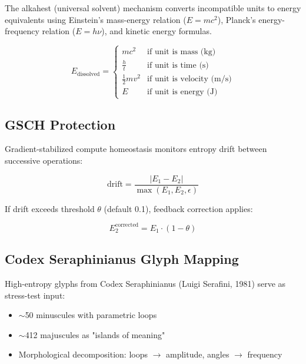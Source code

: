 \documentclass[11pt,a4paper]{article}
\begin{document}
The alkahest (universal solvent) mechanism converts incompatible units to energy equivalents using Einstein's mass-energy relation ($E = mc^2$), Planck's energy-frequency relation ($E = h\nu$), and kinetic energy formulas.

\begin{equation}
    E_{\text{dissolved}} = 
    \begin{cases}
        mc^2 & \text{if unit is mass (kg)} \\
        \frac{h}{t} & \text{if unit is time (s)} \\
        \frac{1}{2}mv^2 & \text{if unit is velocity (m/s)} \\
        E & \text{if unit is energy (J)}
    \end{cases}
\end{equation}

\subsection{GSCH Protection}

Gradient-stabilized compute homeostasis monitors entropy drift between successive operations:

\begin{equation}
    \text{drift} = \frac{|E_1 - E_2|}{\max(E_1, E_2, \epsilon)}
\end{equation}

If drift exceeds threshold $\theta$ (default 0.1), feedback correction applies:

\begin{equation}
    E_2^{\text{corrected}} = E_1 \cdot (1 - \theta)
\end{equation}

\subsection{Codex Seraphinianus Glyph Mapping}

High-entropy glyphs from Codex Seraphinianus (Luigi Serafini, 1981) serve as stress-test input:
\begin{itemize}
    \item $\sim$50 minuscules with parametric loops
    \item $\sim$412 majuscules as "islands of meaning"
    \item Morphological decomposition: loops $\rightarrow$ amplitude, angles $\rightarrow$ frequency
\end{itemize}
\end{document}
